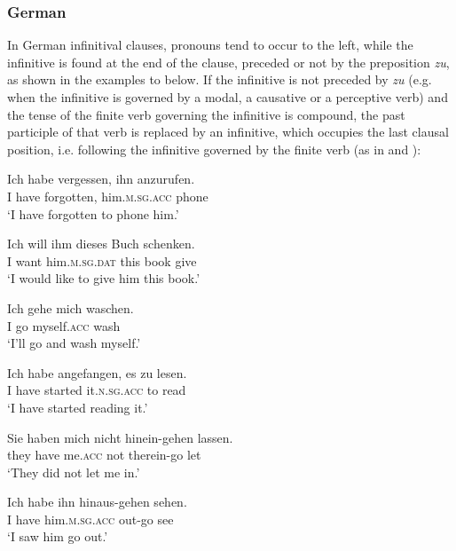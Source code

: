 \documentclass[output=paper,modfonts,nonflat,newtxmath]{langsci/langscibook}
\begin{document}
\subsubsection{German}%

In German infinitival clauses, pronouns tend to occur to the left, while the infinitive is found at the end of the clause, preceded or not by the preposition \textit{zu}, as shown in the examples  to  below. If the infinitive is not preceded by \textit{zu} (e.g. when the infinitive is governed by a modal, a causative or a perceptive verb) and the tense of the finite verb governing the infinitive is compound, the past participle of that verb is replaced by an infinitive, which occupies the last clausal position, i.e. following the infinitive governed by the finite verb (as in  and ):

\ea \label{ex:sciutti:10}
    \gll Ich habe vergessen, ihn anzurufen.\\
        I have forgotten, him.\textsc{m.sg.acc}  phone\\
    \glt  ‘I have forgotten to phone him.’
\z

\ea \label{ex:sciutti:11}
    \gll Ich  will ihm dieses Buch schenken.\\
        I want him.\textsc{m.sg.dat} this  book  give \\
    \glt  ‘I would like to give him this book.’
\z

\ea \label{ex:sciutti:12}
    \gll Ich gehe mich waschen.\\
        I go myself.\textsc{acc} wash \\
    \glt  ‘I’ll go and wash myself.’
\z

\ea \label{ex:sciutti:13}
    \gll Ich habe angefangen, es zu lesen.\\
        I have started it.\textsc{n.sg.acc} to read \\
    \glt  ‘I have started reading it.’
\z


\ea \label{ex:sciutti:14}
    \gll Sie haben mich nicht hinein-gehen lassen.\\
         they have me.\textsc{acc}   not   therein-go let\\
    \glt  ‘They did not let me in.’
\z

\ea \label{ex:sciutti:15}
    \gll Ich habe ihn hinaus-gehen sehen.\\
         I have him.\textsc{m.sg.acc} out-go see\\
    \glt  ‘I saw him go out.’
\z
\end{document}
